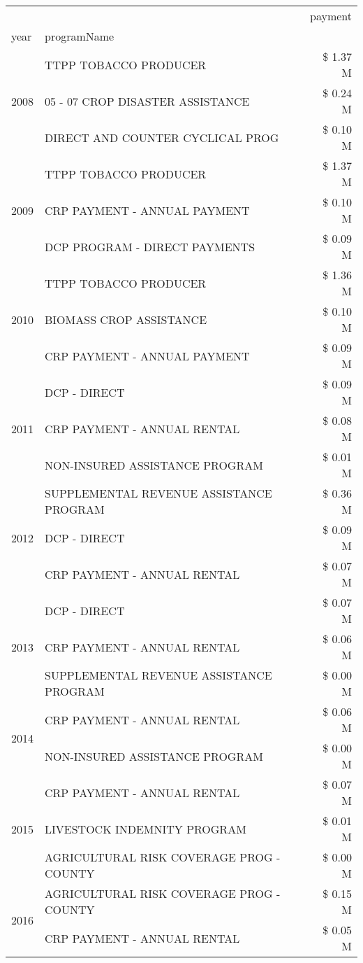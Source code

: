 \begin{tabular}{llr}
\toprule
 &  & payment \\
year & programName &  \\
\midrule
\multirow[t]{3}{*}{2008} & TTPP TOBACCO PRODUCER & \$ 1.37 M \\
 & 05 - 07 CROP DISASTER ASSISTANCE & \$ 0.24 M \\
 & DIRECT AND COUNTER CYCLICAL PROG & \$ 0.10 M \\
\cline{1-3}
\multirow[t]{3}{*}{2009} & TTPP TOBACCO PRODUCER & \$ 1.37 M \\
 & CRP PAYMENT - ANNUAL PAYMENT & \$ 0.10 M \\
 & DCP PROGRAM - DIRECT PAYMENTS & \$ 0.09 M \\
\cline{1-3}
\multirow[t]{3}{*}{2010} & TTPP TOBACCO PRODUCER & \$ 1.36 M \\
 & BIOMASS CROP ASSISTANCE & \$ 0.10 M \\
 & CRP PAYMENT - ANNUAL PAYMENT & \$ 0.09 M \\
\cline{1-3}
\multirow[t]{3}{*}{2011} & DCP - DIRECT & \$ 0.09 M \\
 & CRP PAYMENT - ANNUAL RENTAL & \$ 0.08 M \\
 & NON-INSURED ASSISTANCE PROGRAM & \$ 0.01 M \\
\cline{1-3}
\multirow[t]{3}{*}{2012} & SUPPLEMENTAL REVENUE ASSISTANCE PROGRAM & \$ 0.36 M \\
 & DCP - DIRECT & \$ 0.09 M \\
 & CRP PAYMENT - ANNUAL RENTAL & \$ 0.07 M \\
\cline{1-3}
\multirow[t]{3}{*}{2013} & DCP - DIRECT & \$ 0.07 M \\
 & CRP PAYMENT - ANNUAL RENTAL & \$ 0.06 M \\
 & SUPPLEMENTAL REVENUE ASSISTANCE PROGRAM & \$ 0.00 M \\
\cline{1-3}
\multirow[t]{2}{*}{2014} & CRP PAYMENT - ANNUAL RENTAL & \$ 0.06 M \\
 & NON-INSURED ASSISTANCE PROGRAM & \$ 0.00 M \\
\cline{1-3}
\multirow[t]{3}{*}{2015} & CRP PAYMENT - ANNUAL RENTAL & \$ 0.07 M \\
 & LIVESTOCK INDEMNITY PROGRAM & \$ 0.01 M \\
 & AGRICULTURAL RISK COVERAGE PROG - COUNTY & \$ 0.00 M \\
\cline{1-3}
\multirow[t]{3}{*}{2016} & AGRICULTURAL RISK COVERAGE PROG - COUNTY & \$ 0.15 M \\
 & CRP PAYMENT - ANNUAL RENTAL & \$ 0.05 M \\

\end{tabular}
